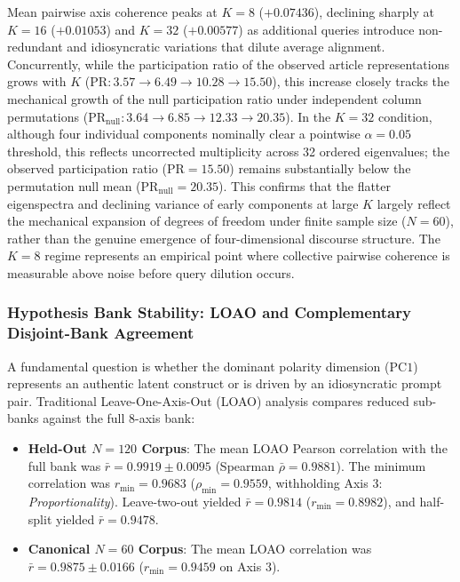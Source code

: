 Mean pairwise axis coherence peaks at $K=8$ ($+0.07436$), declining sharply at $K=16$ ($+0.01053$) and $K=32$ ($+0.00577$) as additional queries introduce non-redundant and idiosyncratic variations that dilute average alignment. Concurrently, while the participation ratio of the observed article representations grows with $K$ ($\mathrm{PR}: 3.57 \to 6.49 \to 10.28 \to 15.50$), this increase closely tracks the mechanical growth of the null participation ratio under independent column permutations ($\mathrm{PR}_{\text{null}}: 3.64 \to 6.85 \to 12.33 \to 20.35$). In the $K=32$ condition, although four individual components nominally clear a pointwise $\alpha = 0.05$ threshold, this reflects uncorrected multiplicity across 32 ordered eigenvalues; the observed participation ratio ($\mathrm{PR} = 15.50$) remains substantially below the permutation null mean ($\mathrm{PR}_{\text{null}} = 20.35$). This confirms that the flatter eigenspectra and declining variance of early components at large $K$ largely reflect the mechanical expansion of degrees of freedom under finite sample size ($N=60$), rather than the genuine emergence of four-dimensional discourse structure. The $K=8$ regime represents an empirical point where collective pairwise coherence is measurable above noise before query dilution occurs.

\subsubsection{Hypothesis Bank Stability: LOAO and Complementary Disjoint-Bank Agreement}
\label{sec:loao_results}

A fundamental question is whether the dominant polarity dimension ($\mathrm{PC1}$) represents an authentic latent construct or is driven by an idiosyncratic prompt pair. Traditional Leave-One-Axis-Out (LOAO) analysis compares reduced sub-banks against the full 8-axis bank:
\begin{itemize}
    \item \textbf{Held-Out $N=120$ Corpus}: The mean LOAO Pearson correlation with the full bank was $\bar{r} = 0.9919 \pm 0.0095$ (Spearman $\bar{\rho} = 0.9881$). The minimum correlation was $r_{\min} = 0.9683$ ($\rho_{\min} = 0.9559$, withholding Axis 3: \emph{Proportionality}). Leave-two-out yielded $\bar{r} = 0.9814$ ($r_{\min} = 0.8982$), and half-split yielded $\bar{r} = 0.9478$.
    \item \textbf{Canonical $N=60$ Corpus}: The mean LOAO correlation was $\bar{r} = 0.9875 \pm 0.0166$ ($r_{\min} = 0.9459$ on Axis 3).
\end{itemize}


